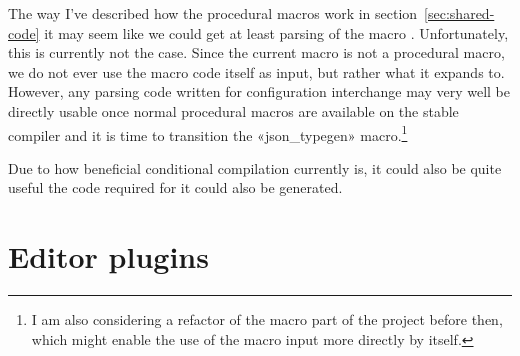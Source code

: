 The way I've described how the procedural macros work in section~\ref{sec:shared-code} it may seem like we could get at least parsing of the macro . Unfortunately, this is currently not the case. Since the current macro is not a procedural macro, we do not ever use the macro code itself as input, but rather what it expands to. However, any parsing code written for configuration interchange may very well be directly usable once normal procedural macros are available on the stable compiler and it is time to transition the «json_typegen» macro.\footnote{I am also considering a refactor of the macro part of the project before then, which might enable the use of the macro input more directly by itself.}



Due to how beneficial conditional compilation currently is, it could also be quite useful the code required for it could also be generated.

\section{Editor plugins}

